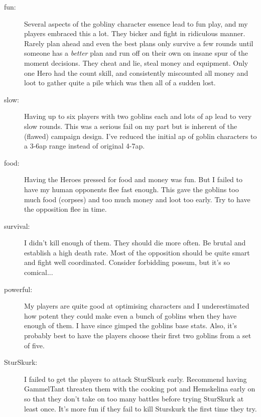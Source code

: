\begin{description}

    \item[fun:] Several aspects of the gobliny character essence lead to fun play, and my players embraced this a lot. They bicker and fight in ridiculous manner. Rarely plan ahead and even the best plans only survive a few rounds until someone has a \emph{better} plan and run off on their own on insane spur of the moment decisions. They cheat and lie, steal money and equipment. Only one Hero had the count skill, and consistently miscounted all money and loot to gather quite a pile which was then all of a sudden lost.

    \item[slow:] Having up to six players with two goblins each and lots of ap lead to very slow rounds. This was a serious fail on my part but is inherent of the (flawed) campaign design. I've reduced the initial ap of goblin characters to a 3-6ap range instead of original 4-7ap.

    \item[food:] Having the Heroes pressed for food and money was fun. But I failed to have my human opponents flee fast enough. This gave the goblins too much food (corpses) and too much money and loot too early. Try to have the opposition flee in time.

    \item[survival:] I didn't kill enough of them. They should die more often. Be brutal and establish a high death rate. Most of the opposition should be quite smart and fight well coordinated. Consider forbidding possum, but it's so comical...

    \item[powerful:] My players are quite good at optimising characters and I underestimated how potent they could make even a bunch of goblins when they have enough of them. I have since gimped the goblins base stats. Also, it's probably best to have the players choose their first two goblins from a set of five.

    \item[SturSkurk:] I failed to get the players to attack SturSkurk early. Recommend having GammelTant threaten them with the cooking pot and Hemskelina early on so that they don't take on too many battles before trying SturSkurk at least once. It's more fun if they fail to kill Sturskurk the first time they try.

\end{description}



